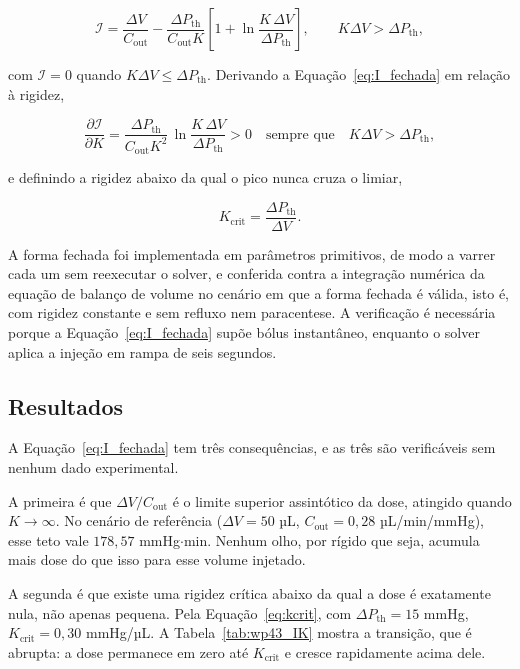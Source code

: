 \begin{equation}
\mathcal{I}=\frac{\Delta V}{C_{\mathrm{out}}}-\frac{\Delta P_{\mathrm{th}}}{C_{\mathrm{out}}K}\left[1+\ln\frac{K\,\Delta V}{\Delta P_{\mathrm{th}}}\right],
\qquad K\Delta V>\Delta P_{\mathrm{th}},
\label{eq:I_fechada}
\end{equation}

com $\mathcal{I}=0$ quando $K\Delta V\le\Delta P_{\mathrm{th}}$. Derivando a Equação~\ref{eq:I_fechada} em relação à rigidez,

\begin{equation}
\frac{\partial\mathcal{I}}{\partial K}=\frac{\Delta P_{\mathrm{th}}}{C_{\mathrm{out}}K^{2}}\,\ln\frac{K\,\Delta V}{\Delta P_{\mathrm{th}}}>0
\quad\text{sempre que}\quad K\Delta V>\Delta P_{\mathrm{th}},
\label{eq:dIdK}
\end{equation}

e definindo a rigidez abaixo da qual o pico nunca cruza o limiar,

\begin{equation}
K_{\mathrm{crit}}=\frac{\Delta P_{\mathrm{th}}}{\Delta V}.
\label{eq:kcrit}
\end{equation}

A forma fechada foi implementada em parâmetros primitivos, de modo a varrer cada um sem reexecutar o solver, e conferida contra a integração numérica da equação de balanço de volume no cenário em que a forma fechada é válida, isto é, com rigidez constante e sem refluxo nem paracentese. A verificação é necessária porque a Equação~\ref{eq:I_fechada} supõe bólus instantâneo, enquanto o solver aplica a injeção em rampa de seis segundos.

\subsection{Resultados}

A Equação~\ref{eq:I_fechada} tem três consequências, e as três são verificáveis sem nenhum dado experimental.

A primeira é que $\Delta V/C_{\mathrm{out}}$ é o limite superior assintótico da dose, atingido quando $K\to\infty$. No cenário de referência ($\Delta V=50$ µL, $C_{\mathrm{out}}=0{,}28$ µL/min/mmHg), esse teto vale $178{,}57$ mmHg$\cdot$min. Nenhum olho, por rígido que seja, acumula mais dose do que isso para esse volume injetado.

A segunda é que existe uma rigidez crítica abaixo da qual a dose é exatamente nula, não apenas pequena. Pela Equação~\ref{eq:kcrit}, com $\Delta P_{\mathrm{th}}=15$ mmHg, $K_{\mathrm{crit}}=0{,}30$ mmHg/µL. A Tabela~\ref{tab:wp43_IK} mostra a transição, que é abrupta: a dose permanece em zero até $K_{\mathrm{crit}}$ e cresce rapidamente acima dele.

